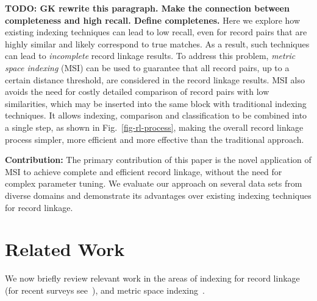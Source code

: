 \documentclass{llncs}
\begin{document}
\textbf{TODO: GK rewrite this paragraph. Make the connection between completeness and high recall. Define completenes.}
Here we explore how existing indexing techniques can lead to
low recall, even for record pairs that are highly similar and likely
correspond to true matches. As a result, such techniques can lead
to \emph{incomplete} record linkage results. To address this problem,
\emph{metric space indexing} (MSI) can be used to guarantee that all
record pairs, up to a certain distance threshold, are considered in the
record linkage results. MSI also avoids the need for costly detailed
comparison of record pairs with low similarities, which may be inserted
into the same block with traditional indexing techniques. It allows
indexing, comparison and classification to be combined into a
single step, as shown in Fig.~\ref{fig-rl-process}, making the overall
record linkage process simpler, more efficient and more effective than
the traditional approach.


\textbf{Contribution:} The primary contribution of this paper is the novel application of MSI to achieve complete and efficient record linkage, without the need for complex parameter tuning.
We evaluate our approach on several data sets from diverse domains and demonstrate its advantages over
existing indexing techniques for record linkage.



\section{Related Work}
\label{sec-related}

We now briefly review relevant work in the areas of indexing
for record linkage (for recent surveys see~\cite{Chr12b,Pap16}),
and metric space indexing~\cite{Zezula2010}.
\end{document}
